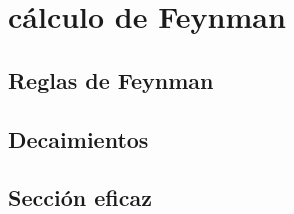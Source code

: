 \chapter{cálculo de Feynman}

\section{Reglas de Feynman}



\section{Decaimientos}

\section{Sección eficaz}